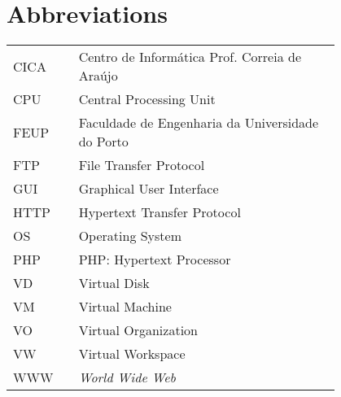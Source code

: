 \chapter*{Abbreviations}

\begin{flushleft}
\begin{tabular}{l p{0.8\linewidth}}
CICA	 & Centro de Informática Prof. Correia de Araújo\\
CPU	 & Central Processing Unit\\
FEUP	 & Faculdade de Engenharia da Universidade do Porto\\
FTP	 & File Transfer Protocol\\
GUI	 & Graphical User Interface\\
HTTP	 & Hypertext Transfer Protocol\\
OS	 & Operating System\\
PHP	 & PHP: Hypertext Processor\\
VD	 & Virtual Disk\\
VM	 & Virtual Machine\\
VO	 & Virtual Organization\\
VW	 & Virtual Workspace\\
WWW      & \emph{World Wide Web}
\end{tabular}
\end{flushleft}

